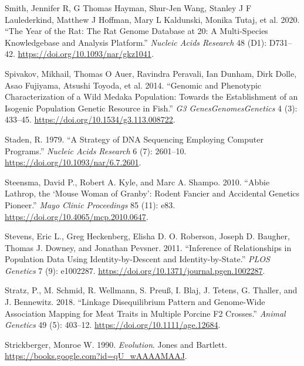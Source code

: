 \documentclass[
]{book}
\newlength{\cslhangindent}
\newlength{\cslentryspacingunit} %
\newenvironment{CSLReferences}[2] %
 {%
  \setlength{\parindent}{0pt}
  \ifodd #1
  \let\oldpar\par
  \def\par{\hangindent=\cslhangindent\oldpar}
  \fi
  \setlength{\parskip}{#2\cslentryspacingunit}
 }%
 {}
\begin{document}
\begin{CSLReferences}{1}{0}
\leavevmode{}%
Smith, Jennifer R, G Thomas Hayman, Shur-Jen Wang, Stanley J F Laulederkind, Matthew J Hoffman, Mary L Kaldunski, Monika Tutaj, et al. 2020. {``The {Year} of the {Rat}: {The Rat Genome Database} at 20: A Multi-Species Knowledgebase and Analysis Platform.''} \emph{Nucleic Acids Research} 48 (D1): D731--42. \url{https://doi.org/10.1093/nar/gkz1041}.

\leavevmode{}%
Spivakov, Mikhail, Thomas O Auer, Ravindra Peravali, Ian Dunham, Dirk Dolle, Asao Fujiyama, Atsushi Toyoda, et al. 2014. {``Genomic and {Phenotypic Characterization} of a {Wild Medaka Population}: {Towards} the {Establishment} of an {Isogenic Population Genetic Resource} in {Fish}.''} \emph{G3 Genes\textbar Genomes\textbar Genetics} 4 (3): 433--45. \url{https://doi.org/10.1534/g3.113.008722}.

\leavevmode{}%
Staden, R. 1979. {``A Strategy of {DNA} Sequencing Employing Computer Programs.''} \emph{Nucleic Acids Research} 6 (7): 2601--10. \url{https://doi.org/10.1093/nar/6.7.2601}.

\leavevmode{}%
Steensma, David P., Robert A. Kyle, and Marc A. Shampo. 2010. {``Abbie {Lathrop}, the {`{Mouse Woman} of {Granby}'}: {Rodent Fancier} and {Accidental Genetics Pioneer}.''} \emph{Mayo Clinic Proceedings} 85 (11): e83. \url{https://doi.org/10.4065/mcp.2010.0647}.

\leavevmode{}%
Stevens, Eric L., Greg Heckenberg, Elisha D. O. Roberson, Joseph D. Baugher, Thomas J. Downey, and Jonathan Pevsner. 2011. {``Inference of {Relationships} in {Population Data Using Identity-by-Descent} and {Identity-by-State}.''} \emph{PLOS Genetics} 7 (9): e1002287. \url{https://doi.org/10.1371/journal.pgen.1002287}.

\leavevmode{}%
Stratz, P., M. Schmid, R. Wellmann, S. Preuß, I. Blaj, J. Tetens, G. Thaller, and J. Bennewitz. 2018. {``Linkage Disequilibrium Pattern and Genome-Wide Association Mapping for Meat Traits in Multiple Porcine {F2} Crosses.''} \emph{Animal Genetics} 49 (5): 403--12. \url{https://doi.org/10.1111/age.12684}.

\leavevmode{}%
Strickberger, Monroe W. 1990. \emph{Evolution}. {Jones and Bartlett}. \url{https://books.google.com?id=qU_wAAAAMAAJ}.


\end{CSLReferences}
\end{document}
